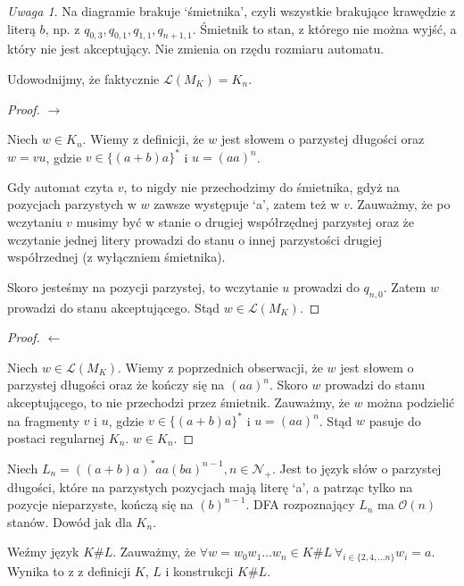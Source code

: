 \documentclass{article}
\theoremstyle{definition}
\theoremstyle{remark}
\newtheorem*{remark}{Uwaga}
\begin{document}
\begin{remark}
    Na diagramie brakuje `śmietnika', czyli wszystkie brakujące krawędzie z literą \(b\), np. z \(q_{0,3},q_{0,1},q_{1,1}, q_{n+1,1}\).
    Śmietnik to stan, z którego nie można wyjść, a który nie jest akceptujący. Nie zmienia on rzędu rozmiaru automatu.
\end{remark}

Udowodnijmy, że faktycznie \(\mathcal{L}(M_K) = K_n\).

\begin{proof}
    \(\rightarrow\)

    Niech \(w \in K_n\). Wiemy z definicji, że \(w\) jest słowem o parzystej długości oraz 
    \(w = vu\), gdzie \(v \in \{(a+b)a\}^*\) i \(u = (aa)^n\).

    Gdy automat czyta \(v\), to nigdy nie przechodzimy do śmietnika, gdyż na pozycjach parzystych w \(w\) zawsze występuje `a', zatem też w \(v\).
    Zauważmy, że po wczytaniu \(v\) musimy być w stanie o drugiej współrzędnej parzystej oraz że wczytanie jednej litery prowadzi
    do stanu o innej parzystości drugiej współrzednej (z wyłączniem śmietnika).

    Skoro jesteśmy na pozycji parzystej, to wczytanie \(u\) prowadzi do \(q_{n,0}\).
    Zatem \(w\) prowadzi do stanu akceptującego. Stąd \(w \in \mathcal{L}(M_K)\).
\end{proof}

\begin{proof}
    \(\leftarrow\)

    Niech \(w \in \mathcal{L}(M_K)\). Wiemy z poprzednich obserwacji, że \(w\) jest słowem o parzystej długości oraz że 
    kończy się na \((aa)^n\). 
    Skoro \(w\) prowadzi do stanu akceptującego, to nie przechodzi przez śmietnik.
    Zauważmy, że \(w\) można podzielić na fragmenty \(v\) i \(u\), gdzie \(v \in \{(a+b)a\}^*\) i \(u = (aa)^n\).
    Stąd \(w\) pasuje do postaci regularnej \(K_n\). \(w \in K_n\).

\end{proof}


Niech \(L_n = ( (a+b)a )^* aa (ba)^{n-1}, n \in \mathcal{N_+}\). Jest to język
słów o parzystej długości, które na parzystych pozycjach mają literę `a', a
patrząc tylko na pozycje nieparzyste, kończą się na \( (b)^{n-1}\). DFA rozpoznający \(L_n\)
ma \(\mathcal{O}(n)\) stanów. Dowód jak dla \(K_n\).

Weźmy język \(K \# L\). Zauważmy, że \( \forall w= w_0 w_1 \ldots w_n \in K \#
L \ \forall_{i \in \{ 2, 4, \ldots n \} } w_i = a\). Wynika to z z definicji
\(K\), \(L\) i konstrukcji \(K \# L\).
\end{document}
